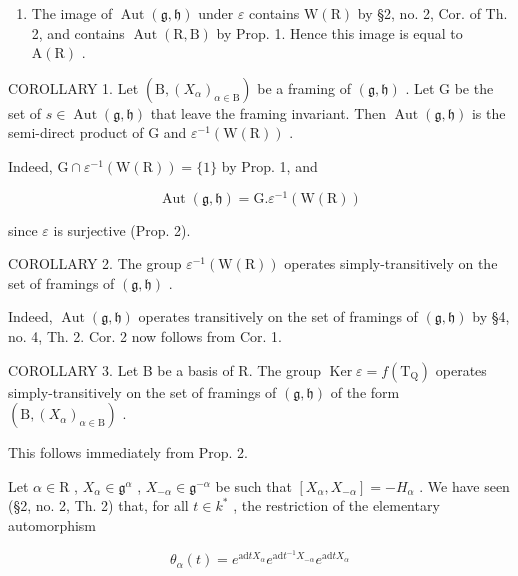 \begin{enumerate}
\def\labelenumi{\alph{enumi})}
\setcounter{enumi}{3}
\tightlist
\item
  The image of \(\operatorname{Aut}(\mathfrak{g},\mathfrak{h})\) under \(\varepsilon\) contains \(\mathrm{W}(\mathrm{R})\) by §2, no. 2, Cor. of Th. 2, and contains \(\operatorname{Aut}(\mathrm{R},\mathrm{B})\) by Prop. 1. Hence this image is equal to \(\mathrm{A}(\mathrm{R})\) .
\end{enumerate}

COROLLARY 1. Let \((\mathrm{B}, (X_{\alpha})_{\alpha \in \mathrm{B}})\) be a framing of \((\mathfrak{g}, \mathfrak{h})\) . Let \(\mathrm{G}\) be the set of \(s \in \operatorname{Aut}(\mathfrak{g}, \mathfrak{h})\) that leave the framing invariant. Then \(\operatorname{Aut}(\mathfrak{g}, \mathfrak{h})\) is the semi-direct product of \(\mathrm{G}\) and \(\varepsilon^{-1}(\mathrm{W}(\mathrm{R}))\) .

Indeed, \(\mathrm{G} \cap \varepsilon^{-1}(\mathrm{W}(\mathrm{R})) = \{1\}\) by Prop. 1, and

\[
\operatorname{Aut} (\mathfrak {g}, \mathfrak {h}) = \mathrm{G}. \varepsilon^ {- 1} (\mathrm{W(R)})
\]

since \(\varepsilon\) is surjective (Prop. 2).

COROLLARY 2. The group \(\varepsilon^{-1}(\mathrm{W}(\mathrm{R}))\) operates simply-transitively on the set of framings of \((\mathfrak{g},\mathfrak{h})\) .

Indeed, \(\operatorname{Aut}(\mathfrak{g},\mathfrak{h})\) operates transitively on the set of framings of \((\mathfrak{g},\mathfrak{h})\) by §4, no. 4, Th. 2. Cor. 2 now follows from Cor. 1.

COROLLARY 3. Let B be a basis of R. The group \(\operatorname{Ker} \varepsilon = f(\mathrm{T}_{\mathrm{Q}})\) operates simply-transitively on the set of framings of \((\mathfrak{g}, \mathfrak{h})\) of the form \((\mathrm{B}, (X_{\alpha})_{\alpha \in \mathrm{B}})\) .

This follows immediately from Prop. 2.

Let \(\alpha \in \mathrm{R}\) , \(X_{\alpha} \in \mathfrak{g}^{\alpha}\) , \(X_{-\alpha} \in \mathfrak{g}^{-\alpha}\) be such that \([X_{\alpha}, X_{-\alpha}] = -H_{\alpha}\) . We have seen (§2, no. 2, Th. 2) that, for all \(t \in k^{*}\) , the restriction of the elementary automorphism

\[
\theta_ {\alpha} (t) = e ^ {\mathrm{ad} t X _ {\alpha}} e ^ {\mathrm{ad} t ^ {- 1} X _ {- \alpha}} e ^ {\mathrm{ad} t X _ {\alpha}}
\]

